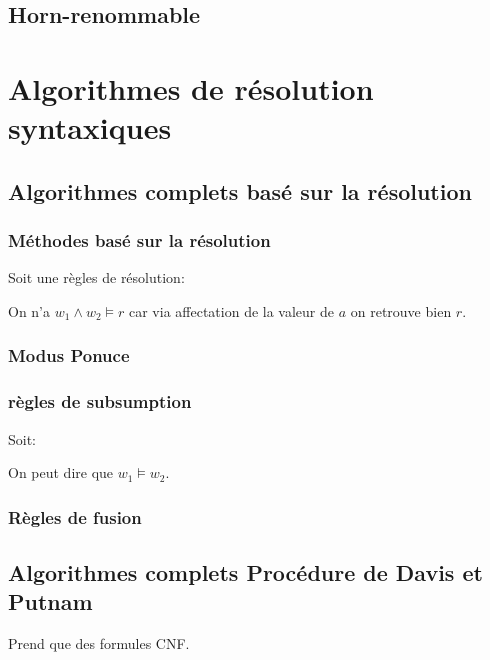 \section{Horn-renommable}
\pagebreak

\chapter{Algorithmes de résolution syntaxiques}
\pagebreak
\section{Algorithmes complets basé sur la résolution}
\subsection{Méthodes basé sur la résolution}

Soit une règles de résolution:

On n'a $w_1 \wedge w_2 \models r$ car via affectation de la valeur de $a$ on retrouve bien $r$.\\

\subsection{Modus Ponuce}


\subsection{règles de subsumption}

Soit:

On peut dire que $w_1 \models w_2$.

\subsection{Règles de fusion}


\section{Algorithmes complets Procédure de Davis et Putnam}

Prend que des formules CNF.\\

